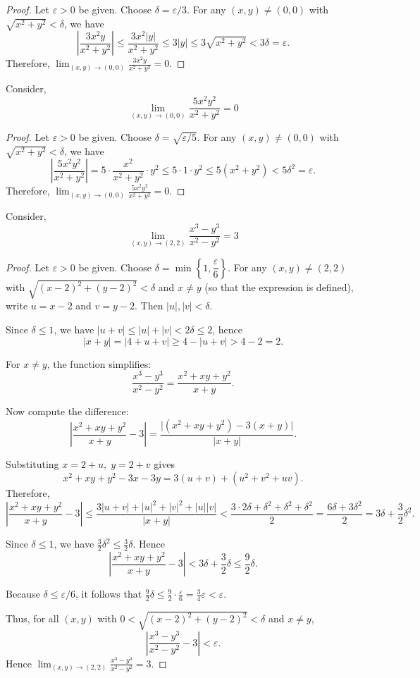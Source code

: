 \begin{proof}
	Let \(\varepsilon > 0\) be given. Choose \(\delta = \varepsilon/3\). For any \((x,y) \neq (0,0)\) with \(\sqrt{x^2+y^2} < \delta\), we have
	\[
		\left| \frac{3x^2 y}{x^2+y^2} \right| \le \frac{3x^2 |y|}{x^2+y^2} \le 3|y| \le 3\sqrt{x^2+y^2} < 3\delta = \varepsilon.
	\]
	Therefore, \(\displaystyle \lim_{(x,y)\to(0,0)} \frac{3x^2 y}{x^2+y^2} = 0\).
\end{proof}
\begin{example}
	Consider,
	$$
		\lim_{(x,y)\rightarrow (0,0)}\frac{5x^2y^2}{x^2+y^2}=0
	$$
\end{example}
\begin{proof}
	Let \(\varepsilon > 0\) be given. Choose \(\delta = \sqrt{\varepsilon/5}\). For any \((x,y) \neq (0,0)\) with \(\sqrt{x^2+y^2} < \delta\), we have
	\[
		\left| \frac{5x^2 y^2}{x^2+y^2} \right| = 5\cdot\frac{x^2}{x^2+y^2}\cdot y^2 \le 5\cdot 1\cdot y^2 \le 5(x^2+y^2) < 5\delta^2 = \varepsilon.
	\]
	Therefore, \(\displaystyle \lim_{(x,y)\to(0,0)} \frac{5x^2 y^2}{x^2+y^2} = 0\).
\end{proof}
\begin{example}
	Consider,
	$$
		\lim_{(x,y)\rightarrow (2,2)}\frac{x^3-y^3}{x^2-y^2}=3
	$$
\end{example}
\begin{proof}
	Let \(\varepsilon > 0\) be given. Choose \(\delta = \min\left\{1, \dfrac{\varepsilon}{6}\right\}\).
	For any \((x,y) \neq (2,2)\) with \(\sqrt{(x-2)^2+(y-2)^2} < \delta\) and \(x \neq y\) (so that the expression is defined), write \(u = x-2\) and \(v = y-2\). Then \(|u|,|v| < \delta\).

	Since \(\delta \le 1\), we have \(|u+v| \le |u|+|v| < 2\delta \le 2\), hence
	\[
		|x+y| = |4+u+v| \ge 4 - |u+v| > 4 - 2 = 2.
	\]

	For \(x \neq y\), the function simplifies:
	\[
		\frac{x^3-y^3}{x^2-y^2} = \frac{x^2+xy+y^2}{x+y}.
	\]

	Now compute the difference:
	\[
		\left|\frac{x^2+xy+y^2}{x+y} - 3\right|
		= \frac{\bigl|(x^2+xy+y^2) - 3(x+y)\bigr|}{|x+y|}.
	\]

	Substituting \(x=2+u,\; y=2+v\) gives
	\[
		x^2+xy+y^2 - 3x - 3y = 3(u+v) + (u^2+v^2+uv).
	\]
	Therefore,
	\[
		\left|\frac{x^2+xy+y^2}{x+y} - 3\right|
		\le \frac{3|u+v| + |u|^2+|v|^2+|u||v|}{|x+y|}
		< \frac{3\cdot 2\delta + \delta^2+\delta^2+\delta^2}{2}
		= \frac{6\delta + 3\delta^2}{2}
		= 3\delta + \frac{3}{2}\delta^2.
	\]

	Since \(\delta \le 1\), we have \(\frac{3}{2}\delta^2 \le \frac{3}{2}\delta\). Hence
	\[
		\left|\frac{x^2+xy+y^2}{x+y} - 3\right| < 3\delta + \frac{3}{2}\delta \le \frac{9}{2}\delta.
	\]

	Because \(\delta \le \varepsilon/6\), it follows that \(\frac{9}{2}\delta \le \frac{9}{2}\cdot\frac{\varepsilon}{6} = \frac{3}{4}\varepsilon < \varepsilon\).

	Thus, for all \((x,y)\) with \(0<\sqrt{(x-2)^2+(y-2)^2}<\delta\) and \(x\neq y\),
	\[
		\left|\frac{x^3-y^3}{x^2-y^2} - 3\right| < \varepsilon.
	\]
	Hence \(\displaystyle \lim_{(x,y)\to(2,2)}\frac{x^3-y^3}{x^2-y^2}=3\).
\end{proof}
